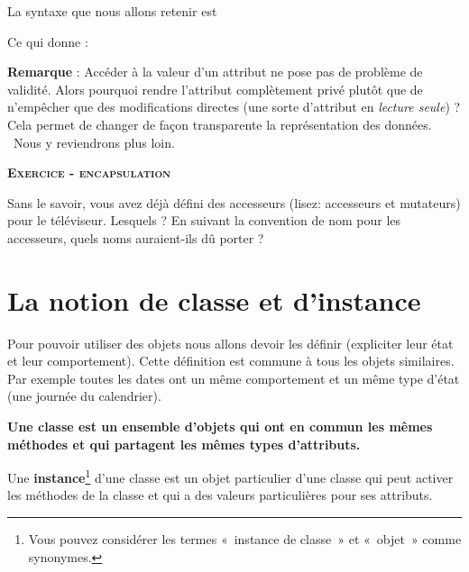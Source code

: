 {
La syntaxe que nous allons retenir est}


\bigskip

{
Ce qui donne :}


{
\textbf{Remarque} : Accéder à la valeur d’un attribut ne pose pas de
problème de validité. Alors pourquoi rendre l’attribut complètement
privé plutôt que de n’empêcher que des modifications directes (une
sorte d’attribut en \textit{lecture seule}) ? Cela permet de changer de
façon transparente la représentation des données. \ Nous y reviendrons
plus loin.}

{\sffamily\bfseries\scshape
Exercice - encapsulation}

{
Sans le savoir, vous avez déjà défini des accesseurs (lisez: accesseurs
et mutateurs) pour le téléviseur. Lesquels ? En suivant la convention
de nom pour les accesseurs, quels noms auraient-ils dû porter ?}

\section[La notion de classe et d'instance]{La notion
de classe et d'instance}
{
Pour pouvoir utiliser des objets nous allons devoir les définir
(expliciter leur état et leur comportement). Cette définition est
commune à tous les objets similaires. Par exemple toutes les dates ont
un même comportement et un même type d'état (une
journée du calendrier).}

{\sffamily\bfseries\upshape
{
Une \textbf{classe} est un ensemble d'objets qui ont en
commun les mêmes méthodes et qui partagent les mêmes types
d'attributs.}}

{
Une \textbf{instance}\footnote{Vous pouvez considérer les termes
«~instance de classe~» et «~objet~» comme synonymes. }
d'une classe est un objet particulier
d'une classe qui peut activer les méthodes de la
classe et qui a des valeurs particulières pour ses attributs.}

